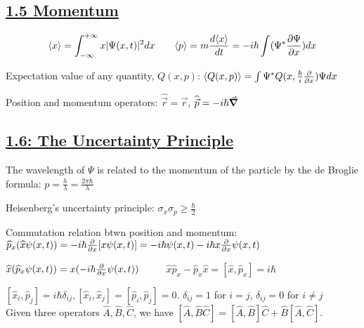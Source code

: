 \subsection{\underline{1.5 Momentum}}
    $$\langle x \rangle = \int_{-\infty}^{+\infty} x |\Psi(x, t)|^2 dx \qquad \langle p \rangle = m \frac{d \langle x \rangle}{dt} = -i \hbar \int (\Psi^* \pdv{\Psi}{x}) dx$$

Expectation value of any quantity, $Q(x, p)$:
$\langle Q(x, p) \rangle = \int \Psi^* Q(x, \frac{\hbar}{i} \pdv{}{x}) \Psi dx$

Position and momentum operators: $\widehat{\vec{r}} = \vec{r}$, $\widehat{\vec{p}} = -i \hbar \vec{\grad}$

\subsection{\underline{1.6: The Uncertainty Principle}}
The wavelength of $\Psi$ is related to the momentum of the particle by the de Broglie formula:
    $p = \frac{h}{\lambda} = \frac{2 \pi \hbar}{\lambda}$

Heisenberg's uncertainty principle: $\sigma_x \sigma_p \geq \frac{\hbar}{2}$

Commutation relation btwn position and momentum:
$\widehat{p}_x (\widehat{x} \psi(x, t)) = -i \hbar \pdv{}{x} [x \psi(x, t)] = -i \hbar \psi(x, t) - i \hbar x \pdv{}{x} \psi(x, t)$

$\widehat{x} (\widehat{p}_x \psi(x, t)) = x (-i \hbar \pdv{}{x} \psi(x, t))$
$\qquad$
$\widehat{x} \widehat{p}_x - \widehat{p}_x \widehat{x} = [\widehat{x}, \widehat{p}_x] = i \hbar$

$[\widehat{x}_i, \widehat{p}_j ] = i \hbar \delta_{ij}, [\widehat{x}_i, \widehat{x}_j] = [\widehat{p}_i, \widehat{p}_j] = 0$. $\delta_{ij} = 1$ for $i=j$, $\delta_{ij} = 0$ for $i \neq j$ \\

Given three operators $\widehat{A}, \widehat{B}, \widehat{C}$, we have $[\widehat{A}, \widehat{B}\widehat{C}] = [\widehat{A}, \widehat{B}] \widehat{C} + \widehat{B} [\widehat{A}, \widehat{C}]$.



